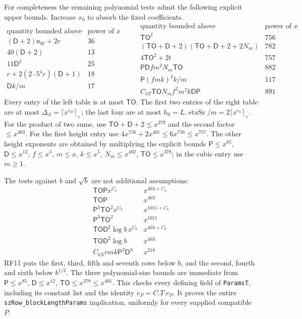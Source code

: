 \documentclass[11pt,a4paper]{article}
\numberwithin{equation}{section}
\theoremstyle{remark}\newtheorem{remark}[theorem]{Remark}
\begin{document}
For completeness the remaining polynomial tests admit the following
explicit upper bounds. Increase $x_0$ to absorb the fixed coefficients.
\[
\begin{array}{l|r}
\text{quantity bounded above}&\text{power of }x\\ \hline
(\mathsf D+2)\mathsf n_W+2r&36\\
40(\mathsf D+2)&13\\
11\mathsf D^2&25\\
r+2(2\cdot5^4r)(\mathsf D+1)&18\\
\mathsf D k/m&17
\end{array}
\qquad
\begin{array}{l|r}
\text{quantity bounded above}&\text{power of }x\\ \hline
\mathsf{TO}^2&756\\
(\mathsf{TO}+\mathsf D+2)
 (\mathsf{TO}+\mathsf D+2+2N_m)&782\\
4\mathsf{TO}^2+2t&757\\
\mathsf P\mathsf D f m^2N_m\mathsf{TO}&882\\
\mathsf P(fmk)^3k/m&117\\
C_{hT}\mathsf{TO}N_m f^2m^2k\mathsf D\mathsf P&891
\end{array}                                                   \tag{RF.42}
\]
Every entry of the left table is at most $\mathsf{TO}$.
The first two entries of the right table are at most
$\Delta_{\mathrm{cl}}=\lceil x^{c_D}\rceil_+$; the last four are at most
$h_0=L.\operatorname{etaSz}/m=2\lceil x^{c_h}\rceil_+$.
For the product of two sums, use
$\mathsf{TO}+\mathsf D+2\leq x^{379}$ and the second factor
$\leq x^{403}$. For the first height entry use
$4x^{756}+2x^{401}\leq6x^{756}\leq x^{757}$.
The other height exponents are obtained by multiplying the explicit
bounds $\mathsf P\leq x^{85}$, $\mathsf D\leq x^{12}$,
$f\leq x^3$, $m\leq x$, $k\leq x^5$, $N_m\leq x^{402}$,
$\mathsf{TO}\leq x^{378}$; in the cubic entry use $m\geq1$.

The tests against $b$ and $\sqrt b$ are not additional assumptions:
\[
\begin{array}{l|r}
\mathsf{TO}\mathsf P x^{C_b}&x^{463+C_b}\\
\mathsf{TO}\mathsf P&x^{463}\\
\mathsf P^3\mathsf{TO}^2x^{C_b}&x^{1011+C_b}\\
\mathsf P^3\mathsf{TO}^2&x^{1011}\\
\mathsf{TO}\mathsf D^2\log b\,x^{C_b}&x^{403+C_b}\\
\mathsf{TO}\mathsf D^2\log b&x^{403}\\
C_{bN}rmk\mathsf P^2\mathsf D^3&x^{218}
\end{array}                                                   \tag{RF.43}
\]
RF11 puts the first, third, fifth and seventh rows below $b$, and the
second, fourth and sixth below $b^{1/2}$.
The three polynomial-size bounds are immediate from
$\mathsf P\leq x^{85}$, $\mathsf D\leq x^{12}$,
$\mathsf{TO}\leq x^{378}\leq x^{401}$.
This checks every defining field of \texttt{ParamsT}, including its
constant list and the identity $e_P=C.T.e_P$.
It proves the entire \texttt{szRow\_\allowbreak blockLengthParams} implication,
uniformly for every supplied compatible $P$.
\end{document}
